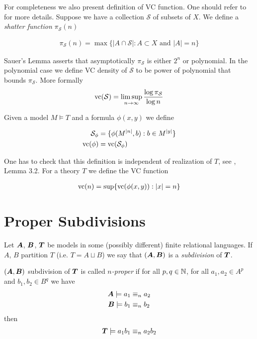 \documentclass{amsart}
\DeclareMathOperator{\TT}{\boldface T}
\DeclareMathOperator{\A}{\boldface A}
\DeclareMathOperator{\B}{\boldface B}
\newcommand{\CS}{\mathcal S}
\begin{document}
For completeness we also present definition of VC function.
One should refer to \cite{vc_density} for more details.
Suppose we have a collection $\CS$ of subsets of $X$. We define a \emph{shatter function} $\pi_\CS(n)$

\begin{align*}
	\pi_\CS(n) = \max \{|A \cap \CS| : A \subset X \text{ and } |A| = n\}
\end{align*}

Sauer's Lemma asserts that asymptotically $\pi_\CS$ is either $2^n$ or polynomial.
In the polynomial case we define VC density of $\CS$ to be power of polynomial that bounds $\pi_\CS$.
More formally 
\begin{align*}
	\vc(\CS) = \limsup_{n \to \infty}\frac{\log \pi_\CS}{\log n}
\end{align*}

Given a model $M \models T$ and a formula $\phi(x, y)$ we define 

\begin{align*}
	\CS_\phi &= \{\phi(M^{|n|}, b) : b \in M^{|y|}\} \\
	\vc(\phi) &=  \vc(\CS_\phi)
\end{align*}

One has to check that this definition is independent of realization of $T$, see \cite{vc_density}, Lemma 3.2. For a theory $T$ we define the VC function

\begin{align*}
	\operatorname{vc}(n) = \sup \{\operatorname{vc}(\phi(x, y)) : |x| = n\}
\end{align*}

\section{Proper Subdivisions}
\begin{Definition}
	Let $\A$, $\B$, $\TT$ be models in some (possibly different) finite relational languages. If $A$, $B$ partition $T$ (i.e. $T = A \sqcup B$) we say that $(\A, \B)$ is a \emph{subdivision} of $\TT$.
\end{Definition}

\begin{Definition}
	$(\A, \B)$ subdivision of $\TT$ is called \emph{$n$-proper} if for all $p,q \in \mathbb{N}$, for all $a_1, a_2 \in A^p$ and $b_1, b_2 \in B^q$ we have
	\begin{align*}
		\A \models a_1 &\equiv_n a_2 \\
		\B \models b_1 &\equiv_n b_2
	\end{align*}
	then
	\begin{align*}
		\TT \models a_1b_1 \equiv_n a_2b_2
	\end{align*}
\end{Definition}
\end{document}
